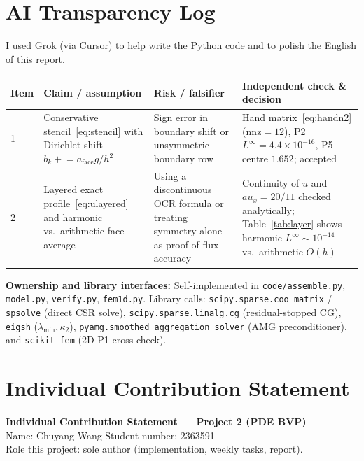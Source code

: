 \documentclass[11pt,a4paper]{article}
\begin{document}
\appendix
\section{AI Transparency Log}
I used Grok (via Cursor) to help write the Python code and to polish the English of this report.

\begin{center}
\small
\begin{tabular}{@{}lp{}p{}p{}@{}}
\toprule
Item & Claim / assumption & Risk / falsifier & Independent check \& decision\\
\midrule
1 & Conservative stencil~\eqref{eq:stencil} with Dirichlet shift \(b_k\mathrel{+}=a_{\mathrm{face}}g/h^2\) & Sign error in boundary shift or unsymmetric boundary row & Hand matrix~\eqref{eq:handn2} (\(\mathrm{nnz}=12\)), P2 \(L^\infty=4.4\times 10^{-16}\), P5 centre \(1.652\); accepted\\
2 & Layered exact profile~\eqref{eq:ulayered} and harmonic vs.\ arithmetic face average & Using a discontinuous OCR formula or treating symmetry alone as proof of flux accuracy & Continuity of \(u\) and \(au_x=20/11\) checked analytically; Table~\ref{tab:layer} shows harmonic \(L^\infty\sim 10^{-14}\) vs.\ arithmetic \(O(h)\)\\
\bottomrule
\end{tabular}
\end{center}
\noindent
\textbf{Ownership and library interfaces:} Self-implemented in \texttt{code/assemble.py}, \texttt{model.py}, \texttt{verify.py}, \texttt{fem1d.py}. Library calls: \texttt{scipy.sparse.coo\_matrix} / \texttt{spsolve} (direct CSR solve), \texttt{scipy.sparse.linalg.cg} (residual-stopped CG), \texttt{eigsh} (\(\lambda_{\min}, \kappa_2\)), \texttt{pyamg.smoothed\_aggregation\_solver} (AMG preconditioner), and \texttt{scikit-fem} (2D P1 cross-check).

\section{Individual Contribution Statement}
\noindent\textbf{Individual Contribution Statement --- Project 2 (PDE BVP)}\\
Name: Chuyang Wang \qquad Student number: 2363591\\
Role this project: sole author (implementation, weekly tasks, report).
\end{document}
